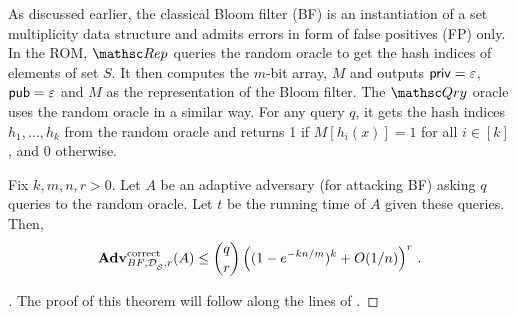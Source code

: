 As discussed earlier, the classical Bloom filter (BF) is an instantiation of a set multiplicity data structure and admits errors in form of false  positives (FP) only. In the ROM, $\Rep$ queries the random oracle to get the hash indices of elements of set $S$. It then computes the $m$-bit array, $M$ and outputs ${\sf priv}=\varepsilon$, ${\sf pub} = \varepsilon$ and $M$ as the representation of
the Bloom filter. The $\Qry$ oracle uses the random oracle in a similar way. For any query $q$, it gets the hash indices $h_1, \ldots, h_k$ from the random oracle and returns 1 if $M[h_i(x)]=1$ for all $i\in [k]$, and 0 otherwise.
\begin{theorem}\label{thm3}
Fix $k,m,n,r>0$. Let $A$ be an adaptive adversary (for attacking BF) asking $q$ queries to the random oracle. Let $t$ be the running time of $A$ given these queries. Then, 
\[
\mathrm{\mathbf{Adv}}^{\mathrm{correct}}_{{BF},\mathcal{D}_{{\cal S}}^{},r}(A) \leq  {\dbinom{q}{r}} \left( (1-e^{-kn/m})^k + O(1/n) \right)^r\,.
\]
\end{theorem}

\begin{proof}[]
The proof of this theorem will follow along the lines of .
\end{proof}
